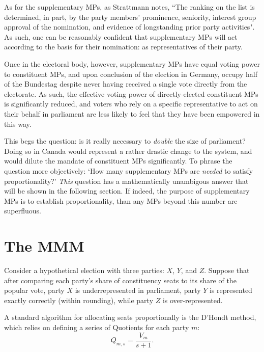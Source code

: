 \documentclass[DIV=calc, paper=a4, fontsize=11pt, twocolumn]{scrartcl}	 %
\begin{document}
As for the supplementary MPs, as Strattmann notes\cite{Stratmann}, ``The ranking on the list is determined, in part, by the party members' prominence, seniority, interest group approval of the nomination, and evidence of longstanding prior party activities". 
As such, one can be reasonably confident that supplementary MPs will act according to the basis for their nomination: as representatives of their party.

Once in the electoral body, however, supplementary MPs have equal voting power to constituent MPs, and upon conclusion of the election in Germany, occupy half of the Bundestag despite never having received a single vote directly from the electorate. As such, the effective voting power of directly-elected constituent MPs is significantly reduced, and voters who rely on a specific representative to act on their behalf in parliament are less likely to feel that they have been empowered in this way. 

This begs the question: is it really necessary to \emph{double} the size of parliament? Doing so in Canada would represent a rather drastic change to the system, and would dilute the mandate of constituent MPs significantly. To phrase the question more objectively: `How many supplementary MPs are \emph{needed} to satisfy proportionality?' 
\emph{This} question has a mathematically unambigous answer that will be shown in the following section. If indeed, the purpose of supplementary MPs is to establish proportionality, than any MPs beyond this number are superfluous.

\section{The MMM}
\label{sec:model_proposal}

Consider a hypothetical election with three parties: $X$, $Y$, and $Z$. Suppose that after comparing each party's share of constituency seats to its share of the popular vote, party $X$ is underrepresented in parliament, party $Y$ is represented exactly correctly (within rounding), while party $Z$ is over-represented. 

A standard algorithm for allocating seats proportionally is the D'Hondt method, which relies on defining a series of Quotients for each party $m$:
\begin{equation}
\label{eq:Dhondt}
Q_{m,s} = \frac{V_m}{s +1}.
\end{equation}
\end{document}
